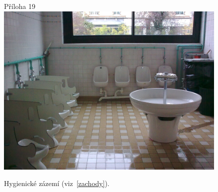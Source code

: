 	\begin{figure}[tb]
		\centering
		Příloha 19\\
		\includegraphics[height=0.35\textheight]{./fotky/Obr19.jpg}
		\caption{
			Hygienické zázemí (viz~\ref{zachody}).
		}
		\label{Obr19}
	\end{figure}

